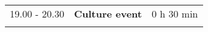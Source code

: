\begin{longtable}{p{3cm}p{10cm}p{4cm}}
\vspace{1cm}
19.00 - 20.30 & {\bf Culture event} & \hfill 0 h 30 min\\ 
\vspace{1cm}
\end{longtable}

